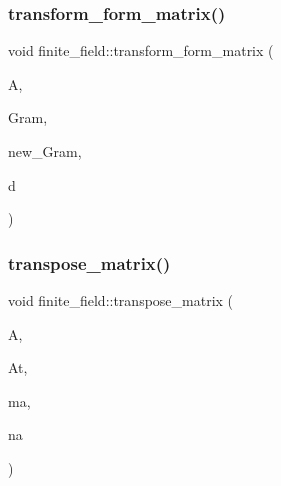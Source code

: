 \mbox{\label{classfinite__field_a6a5307b138cc307ed5c9077e49a7b748}} 
\subsubsection{\texorpdfstring{transform\+\_\+form\+\_\+matrix()}{transform\_form\_matrix()}}
{\footnotesize\ttfamily void finite\+\_\+field\+::transform\+\_\+form\+\_\+matrix (\begin{DoxyParamCaption}\item[{\mbox{\hyperlink{galois_8h_a09fddde158a3a20bd2dcadb609de11dc}{I\+NT}} $\ast$}]{A,  }\item[{\mbox{\hyperlink{galois_8h_a09fddde158a3a20bd2dcadb609de11dc}{I\+NT}} $\ast$}]{Gram,  }\item[{\mbox{\hyperlink{galois_8h_a09fddde158a3a20bd2dcadb609de11dc}{I\+NT}} $\ast$}]{new\+\_\+\+Gram,  }\item[{\mbox{\hyperlink{galois_8h_a09fddde158a3a20bd2dcadb609de11dc}{I\+NT}}}]{d }\end{DoxyParamCaption})}

\mbox{\label{classfinite__field_ada37d61256296777bbc4104bdcf87116}} 
\subsubsection{\texorpdfstring{transpose\+\_\+matrix()}{transpose\_matrix()}}
{\footnotesize\ttfamily void finite\+\_\+field\+::transpose\+\_\+matrix (\begin{DoxyParamCaption}\item[{\mbox{\hyperlink{galois_8h_a09fddde158a3a20bd2dcadb609de11dc}{I\+NT}} $\ast$}]{A,  }\item[{\mbox{\hyperlink{galois_8h_a09fddde158a3a20bd2dcadb609de11dc}{I\+NT}} $\ast$}]{At,  }\item[{\mbox{\hyperlink{galois_8h_a09fddde158a3a20bd2dcadb609de11dc}{I\+NT}}}]{ma,  }\item[{\mbox{\hyperlink{galois_8h_a09fddde158a3a20bd2dcadb609de11dc}{I\+NT}}}]{na }\end{DoxyParamCaption})}

